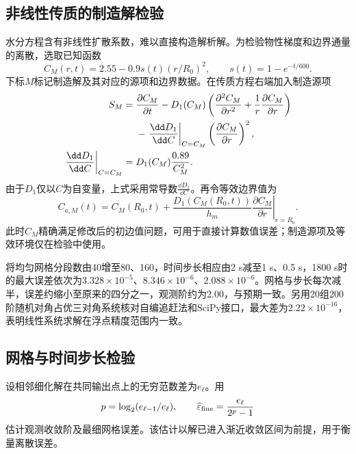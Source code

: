 \subsection{非线性传质的制造解检验}
水分方程含有非线性扩散系数，难以直接构造解析解。为检验物性梯度和边界通量的离散，选取已知函数
\begin{equation}
C_M(r,t)=2.55-0.9s(t)(r/R_0)^2,\qquad s(t)=1-e^{-t/600}.
\end{equation}
下标$M$标记制造解及其对应的源项和边界数据。在传质方程右端加入制造源项
\begin{align}
S_M={}&\frac{\partial C_M}{\partial t}
-D_1(C_M)\left(\frac{\partial^2 C_M}{\partial r^2}+\frac1r\frac{\partial C_M}{\partial r}\right)\notag\\
&-\left.\frac{\dd D_1}{\dd C}\right|_{C=C_M}\left(\frac{\partial C_M}{\partial r}\right)^2,\\
\left.\frac{\dd D_1}{\dd C}\right|_{C=C_M}={}&D_1(C_M)\frac{0.89}{C_M^2}.
\end{align}
由于$D_1$仅以$C$为自变量，上式采用常导数$\frac{\dd D_1}{\dd C}$。再令等效边界值为
\begin{equation*}
C_{a,M}(t)=C_M(R_0,t)+\frac{D_1(C_M(R_0,t))}{h_m}\left.\frac{\partial C_M}{\partial r}\right|_{r=R_0}.
\end{equation*}
此时$C_M$精确满足修改后的初边值问题，可用于直接计算数值误差；制造源项及等效环境仅在检验中使用。

将均匀网格分段数由40增至80、160，时间步长相应由2 s减至1 s、0.5 s，1800 s时的最大误差依次为$3.328\times10^{-5}$、$8.346\times10^{-6}$、$2.088\times10^{-6}$\cunit。网格与步长每次减半，误差约缩小至原来的四分之一，观测阶约为2.00，与预期一致。另用20组200阶随机对角占优三对角系统核对自编追赶法和SciPy接口，最大差为$2.22\times10^{-16}$，表明线性系统求解在浮点精度范围内一致。

\subsection{网格与时间步长检验}
设相邻细化解在共同输出点上的无穷范数差为$e_\ell$。用
\begin{equation}
p=\log_2(e_{\ell-1}/e_\ell),\qquad
\widehat\varepsilon_{\rm fine}=\frac{e_\ell}{2^p-1}
\label{eq:richardson}
\end{equation}
估计观测收敛阶及最细网格误差\cite{num}。该估计以解已进入渐近收敛区间为前提，用于衡量离散误差。

